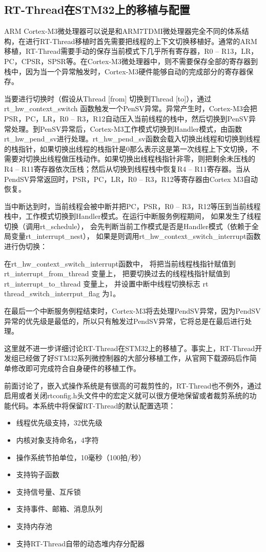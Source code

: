 \subsection{RT-Thread在STM32上的移植与配置}
ARM{\reg} Cortex{\reg}-M3微处理器可以说是和ARM7TDMI微处理器完全不同的体系结构，在进行RT-Thread移植时首先需要把线程的上下文切换移植好。通常的ARM移植，RT-Thread需要手动的保存当前模式下几乎所有寄存器，R0 – R13，LR，PC，CPSR，SPSR等。在Cortex{\reg}-M3微处理器中，则不需要保存全部的寄存器到栈中，因为当一个异常触发时，Cortex{\reg}-M3硬件能够自动的完成部分的寄存器保存。

当要进行切换时（假设从Thread [from] 切换到Thread [to]），通过 rt{\_}hw{\_}context{\_}switch 函数触发一个PenSV异常。异常产生时，Cortex{\reg}-M3会把PSR，PC，LR，R0 – R3，R12自动压入当前线程的栈中，然后切换到PenSV异常处理。到PenSV异常后，Cortex{\reg}-M3工作模式切换到Handler模式，由函数rt{\_}hw{\_}pend{\_}sv进行处理。rt{\_}hw{\_}pend{\_}sv函数会载入切换出线程和切换到线程的栈指针，如果切换出线程的栈指针是0那么表示这是第一次线程上下文切换，不需要对切换出线程做压栈动作。如果切换出线程栈指针非零，则把剩余未压栈的R4 – R11寄存器依次压栈；然后从切换到线程栈中恢复R4 – R11寄存器。当从PendSV异常返回时，PSR，PC，LR，R0 – R3，R12等寄存器由Cortex{\reg} M3自动恢复。

当中断达到时，当前线程会被中断并把PC，PSR，R0 – R3，R12等压到当前线程栈中，工作模式切换到Handler模式。在运行中断服务例程期间， 如果发生了线程切换（调用rt{\_}schedule）， 会先判断当前工作模式是否是Handler模式（依赖于全局变量rt{\_}interrupt{\_}nest）， 如果是则调用rt{\_}hw{\_}context{\_}switch{\_}interrupt函数进行伪切换：

在rt{\_}hw{\_}context{\_}switch{\_}interrupt函数中， 将把当前线程栈指针赋值到 rt{\_}interrupt{\_}from{\_}thread 变量上， 把要切换过去的线程栈指针赋值到 rt{\_}interrupt{\_}to{\_}thread 变量上， 并设置中断中线程切换标志 rt thread{\_}switch{\_}interrput{\_}flag 为1。

在最后一个中断服务例程结束时，Cortex{\reg}-M3将去处理PendSV异常，因为PendSV异常的优先级是最低的，所以只有触发过PendSV异常，它将总是在最后进行处理。

这里就不进一步详细讨论RT-Thread在STM32上的移植了。事实上，RT-Thread开发组已经做了好STM32系列微控制器的大部分移植工作，从官网下载源码后作简单修改即可完成符合自身硬件的移植工作。

前面讨论了，嵌入式操作系统是有很高的可裁剪性的，RT-Thread也不例外，通过启用或者关闭rtconfig.h头文件中的宏定义就可以很方便地保留或者裁剪系统的功能代码。本系统中将保留RT-Thread的默认配置选项：
\begin{itemize}
\item 线程优先级支持，32优先级
\item 内核对象支持命名，4字符
\item 操作系统节拍单位，10毫秒（100拍/秒）
\item 支持钩子函数
\item 支持信号量、互斥锁
\item 支持事件、邮箱、消息队列
\item 支持内存池
\item 支持RT-Thread自带的动态堆内存分配器
\end{itemize}

